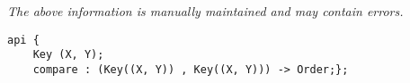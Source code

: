 \label{api:Keyxy}

{\tiny \it The above information is manually maintained and may contain errors.}
\begin{verbatim}
api {
    Key (X, Y);
    compare : (Key((X, Y)) , Key((X, Y))) -> Order;};
\end{verbatim}
